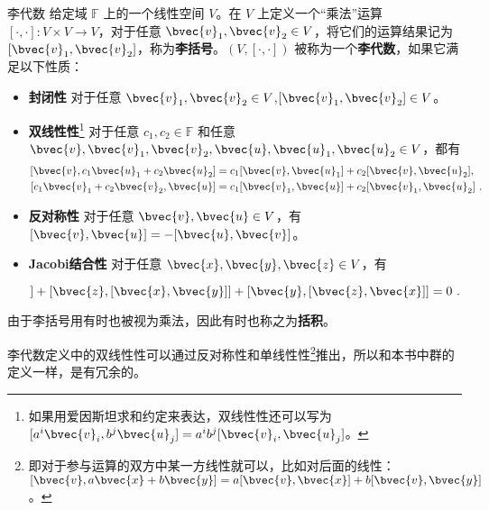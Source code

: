 \begin{definition}{李代数}\label{def_LieAlg_2}
给定域 $\mathbb{F}$ 上的一个线性空间 $V$。在 $V$ 上定义一个“乘法”运算 $[\cdot, \cdot] : V \times V \to V$，对于任意 $\bvec{v}_1, \bvec{v}_2\in V$，将它们的运算结果记为 $[\bvec{v}_1, \bvec{v}_2]$，称为\textbf{李括号}。$(V, [\cdot, \cdot])$ 被称为一个\textbf{李代数}，如果它满足以下性质：

\begin{itemize}
\item \textbf{封闭性} 对于任意 $\bvec{v}_1, \bvec{v}_2\in V$,$[\bvec{v}_1, \bvec{v}_2]\in V$。%

\item \textbf{双线性性}\footnote{如果用爱因斯坦求和约定来表达，双线性性还可以写为 $[a^i\bvec{v}_i, b^j\bvec{u}_j] = a^i b^j[\bvec{v}_i, \bvec{u}_j]$。} 对于任意 $c_1, c_2 \in \mathbb{F}$ 和任意 $\bvec{v}, \bvec{v}_1, \bvec{v}_2, \bvec{u}, \bvec{u}_1, \bvec{u}_2 \in V$，都有 
\begin{equation}
\begin{aligned}
{[\bvec{v}, c_1\bvec{u}_1 + c_2\bvec{u}_2]} &= c_1 [\bvec{v}, \bvec{u}_1] + c_2[\bvec{v}, \bvec{u}_2], \\
[c_1\bvec{v}_1+c_2\bvec{v}_2, \bvec{u}] &= c_1[\bvec{v}_1, \bvec{u}] + c_2[\bvec{v}_1, \bvec{u}_2]~.
\end{aligned}
\end{equation}

\item \textbf{反对称性} 对于任意 $\bvec{v}, \bvec{u}\in V$，有 $[\bvec{v}, \bvec{u}]=-[\bvec{u}, \bvec{v}]$。

\item \textbf{Jacobi结合性} 对于任意 $\bvec{x}, \bvec{y}, \bvec{z}\in V$，有

\begin{equation}
[\bvec{x}, [\bvec{y}, \bvec{z}]]+[\bvec{z}, [\bvec{x}, \bvec{y}]]+[\bvec{y}, [\bvec{z}, \bvec{x}]]=0~.
\end{equation}

\end{itemize}

由于李括号用有时也被视为乘法，因此有时也称之为\textbf{括积}。
\end{definition}


李代数定义中的双线性性可以通过反对称性和单线性性\footnote{即对于参与运算的双方中某一方线性就可以，比如对后面的线性：$[\bvec{v},a\bvec{x}+b\bvec{y}]=a[\bvec{v}, \bvec{x}]+b[\bvec{v}, \bvec{y}]$。}推出，所以和本书中群的定义一样，是有冗余的。


